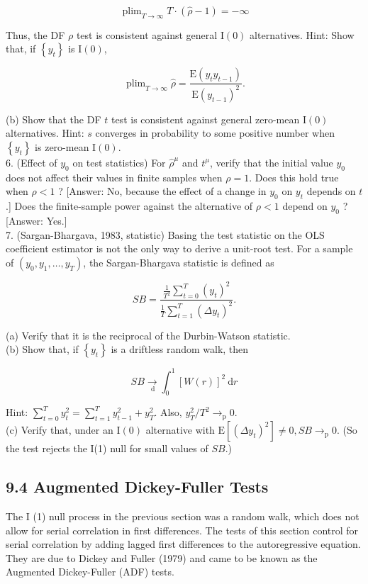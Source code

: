 \documentclass[10pt]{article}
\begin{document}
$$
\operatorname{plim}_{T \rightarrow \infty} T \cdot(\hat{\rho}-1)=-\infty
$$

Thus, the DF $\rho$ test is consistent against general $\mathrm{I}(0)$ alternatives. Hint: Show that, if $\left\{y_{t}\right\}$ is $\mathrm{I}(0)$,

$$
\operatorname{plim}_{T \rightarrow \infty} \hat{\rho}=\frac{\mathrm{E}\left(y_{t} y_{t-1}\right)}{\mathrm{E}\left(y_{t-1}\right)^{2}} .
$$

(b) Show that the DF $t$ test is consistent against general zero-mean $\mathrm{I}(0)$ alternatives. Hint: $s$ converges in probability to some positive number when $\left\{y_{t}\right\}$ is zero-mean $\mathrm{I}(0)$.\\
6. (Effect of $y_{0}$ on test statistics) For $\hat{\rho}^{\mu}$ and $t^{\mu}$, verify that the initial value $y_{0}$ does not affect their values in finite samples when $\rho=1$. Does this hold true when $\rho<1$ ? [Answer: No, because the effect of a change in $y_{0}$ on $y_{t}$ depends on $t$.] Does the finite-sample power against the alternative of $\rho<1$ depend on $y_{0}$ ? [Answer: Yes.]\\
7. (Sargan-Bhargava, 1983, statistic) Basing the test statistic on the OLS coefficient estimator is not the only way to derive a unit-root test. For a sample of $\left(y_{0}, y_{1}, \ldots, y_{T}\right)$, the Sargan-Bhargava statistic is defined as

$$
S B=\frac{\frac{1}{T^{2}} \sum_{t=0}^{T}\left(y_{t}\right)^{2}}{\frac{1}{T} \sum_{t=1}^{T}\left(\Delta y_{t}\right)^{2}} .
$$

(a) Verify that it is the reciprocal of the Durbin-Watson statistic.\\
(b) Show that, if $\left\{y_{t}\right\}$ is a driftless random walk, then

$$
S B \underset{\mathrm{~d}}{\rightarrow} \int_{0}^{1}[W(r)]^{2} \mathrm{~d} r
$$

Hint: $\sum_{t=0}^{T} y_{t}^{2}=\sum_{t=1}^{T} y_{t-1}^{2}+y_{T}^{2}$. Also, $y_{T}^{2} / T^{2} \rightarrow_{\mathrm{p}} 0$.\\
(c) Verify that, under an $\mathrm{I}(0)$ alternative with $\mathrm{E}\left[\left(\Delta y_{t}\right)^{2}\right] \neq 0, S B \rightarrow_{\mathrm{p}} 0$. (So the test rejects the I(1) null for small values of $S B$.)

\subsection*{9.4 Augmented Dickey-Fuller Tests}
The I (1) null process in the previous section was a random walk, which does not allow for serial correlation in first differences. The tests of this section control for serial correlation by adding lagged first differences to the autoregressive equation. They are due to Dickey and Fuller (1979) and came to be known as the Augmented Dickey-Fuller (ADF) tests.
\end{document}
